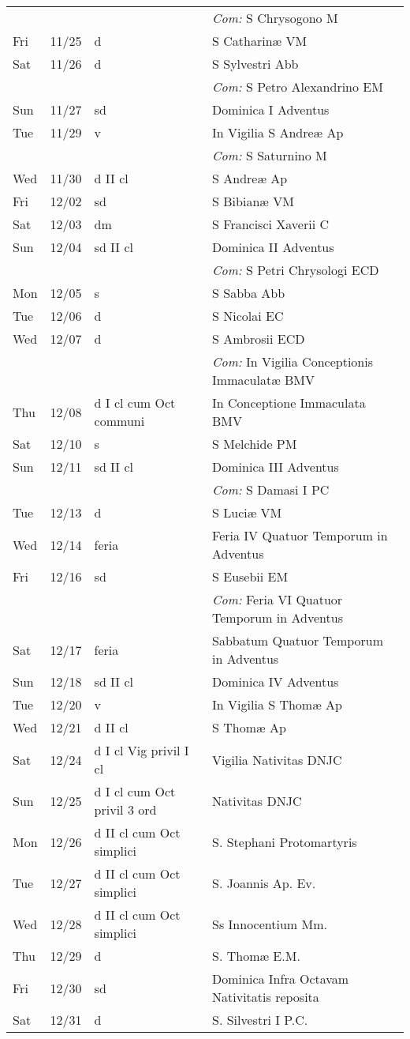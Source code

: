 \documentclass[10pt]{article}
\begin{document}
\begin{longtable}{ l l l l }
 & & & \textit{Com:} S Chrysogono M\\
Fri & 11/25 & d & S Catharinæ VM\\
Sat & 11/26 & d & S Sylvestri Abb\\
 & & & \textit{Com:} S Petro Alexandrino EM\\
Sun & 11/27 & sd & Dominica I Adventus\\
Tue & 11/29 & v & In Vigilia S Andreæ Ap\\
 & & & \textit{Com:} S Saturnino M\\
Wed & 11/30 & d II cl & S Andreæ Ap\\
Fri & 12/02 & sd & S Bibianæ VM\\
Sat & 12/03 & dm & S Francisci Xaverii C\\
Sun & 12/04 & sd II cl & Dominica II Adventus\\
 & & & \textit{Com:} S Petri Chrysologi ECD\\
Mon & 12/05 & s & S Sabba Abb\\
Tue & 12/06 & d & S Nicolai EC\\
Wed & 12/07 & d & S Ambrosii ECD\\
 & & & \textit{Com:} In Vigilia Conceptionis Immaculatæ BMV\\
Thu & 12/08 & d I cl cum Oct communi & In Conceptione Immaculata BMV\\
Sat & 12/10 & s & S Melchide PM\\
Sun & 12/11 & sd II cl & Dominica III Adventus\\
 & & & \textit{Com:} S Damasi I PC\\
Tue & 12/13 & d & S Luciæ VM\\
Wed & 12/14 & feria & Feria IV Quatuor Temporum in Adventus\\
Fri & 12/16 & sd & S Eusebii EM\\
 & & & \textit{Com:} Feria VI Quatuor Temporum in Adventus\\
Sat & 12/17 & feria & Sabbatum Quatuor Temporum in Adventus\\
Sun & 12/18 & sd II cl & Dominica IV Adventus\\
Tue & 12/20 & v & In Vigilia S Thomæ Ap\\
Wed & 12/21 & d II cl & S Thomæ Ap\\
Sat & 12/24 & d I cl Vig privil I cl & Vigilia Nativitas DNJC\\
Sun & 12/25 & d I cl cum Oct privil 3 ord & Nativitas DNJC\\
Mon & 12/26 & d II cl cum Oct simplici & S. Stephani Protomartyris\\
Tue & 12/27 & d II cl cum Oct simplici & S. Joannis Ap. Ev.\\
Wed & 12/28 & d II cl cum Oct simplici & Ss Innocentium Mm.\\
Thu & 12/29 & d & S. Thomæ E.M.\\
Fri & 12/30 & sd & Dominica Infra Octavam Nativitatis reposita\\
Sat & 12/31 & d & S. Silvestri I P.C.\\
\end{longtable}
\end{document}

